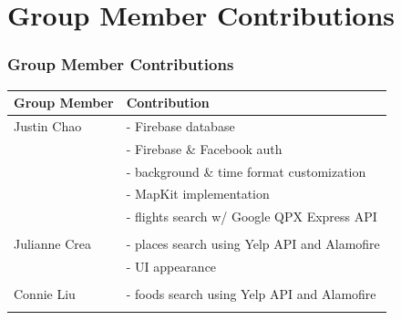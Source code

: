 \documentclass{beamer}
\begin{document}
\section{Group Member Contributions}
\begin{frame}
\frametitle{Group Member Contributions}
    \begin{tabular}{l|l}
        Group Member & Contribution \\
        \hline
        Justin Chao & - Firebase database \\
         & - Firebase \& Facebook auth \\
         & - background \& time format customization \\
         & - MapKit implementation \\
         & - flights search w/ Google QPX Express API \\
         &  \\

        Julianne Crea & - places search using Yelp API and Alamofire \\ 
         & - UI appearance \\
         &  \\
         
        Connie Liu & - foods search using Yelp API and Alamofire \\
         &  \\
    \end{tabular}
\end{frame}
\end{document}
